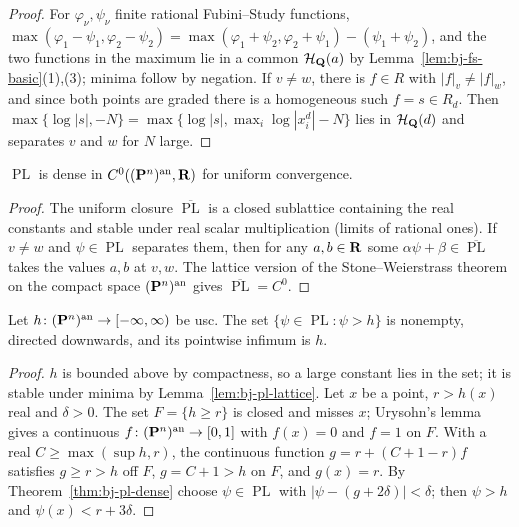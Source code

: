 \begin{proof}
For $\varphi_\nu,\psi_\nu$ finite rational Fubini--Study functions,
$\max(\varphi_1-\psi_1,\varphi_2-\psi_2)=\max(\varphi_1+\psi_2,\varphi_2+\psi_1)-(\psi_1+\psi_2)$, and the two
functions in the maximum lie in a common $\mathcal H_{\mathbf{Q}}(a)$ by Lemma~\ref{lem:bj-fs-basic}(1),(3); minima
follow by negation. If $v\ne w$, there is $f\in R$ with $|f|_v\ne|f|_w$, and since both points are graded
there is a homogeneous such $f=s\in R_d$. Then $\max\{\log|s|,-N\}=\max\{\log|s|,\max_i\log|x_i^d|-N\}$
lies in $\mathcal H_{\mathbf{Q}}(d)$ and separates $v$ and $w$ for $N$ large.
\end{proof}

\begin{theorem}\label{thm:bj-pl-dense}
\leanok
{}
$\operatorname{PL}$ is dense in $C^0((\mathbf{P}^n)^{\mathrm{an}},\mathbf{R})$ for uniform convergence.
\end{theorem}

\begin{proof}
The uniform closure $\overline{\operatorname{PL}}$ is a closed sublattice containing the real constants
and stable under real scalar multiplication (limits of rational ones). If $v\ne w$ and $\psi\in\operatorname{PL}$
separates them, then for any $a,b\in\mathbf{R}$ some $\alpha\psi+\beta\in\overline{\operatorname{PL}}$ takes the
values $a,b$ at $v,w$. The lattice version of the Stone--Weierstrass theorem on the compact space
$(\mathbf{P}^n)^{\mathrm{an}}$ gives $\overline{\operatorname{PL}}=C^0$.
\end{proof}

\begin{lemma}\label{lem:bj-usc-pl}
\leanok
{}
Let $h\colon(\mathbf{P}^n)^{\mathrm{an}}\to[-\infty,\infty)$ be usc. The set $\{\psi\in\operatorname{PL}:\psi>h\}$ is
nonempty, directed downwards, and its pointwise infimum is $h$.
\end{lemma}

\begin{proof}
$h$ is bounded above by compactness, so a large constant lies in the set; it is stable under minima by
Lemma~\ref{lem:bj-pl-lattice}. Let $x$ be a point, $r>h(x)$ real and $\delta>0$. The set $F=\{h\ge r\}$ is
closed and misses $x$; Urysohn's lemma gives a continuous $f\colon(\mathbf{P}^n)^{\mathrm{an}}\to[0,1]$ with $f(x)=0$ and
$f=1$ on $F$. With a real $C\ge\max(\sup h,r)$, the continuous function $g=r+(C+1-r)f$ satisfies
$g\ge r>h$ off $F$, $g=C+1>h$ on $F$, and $g(x)=r$. By Theorem~\ref{thm:bj-pl-dense} choose $\psi\in\operatorname{PL}$
with $|\psi-(g+2\delta)|<\delta$; then $\psi>h$ and $\psi(x)<r+3\delta$.
\end{proof}

